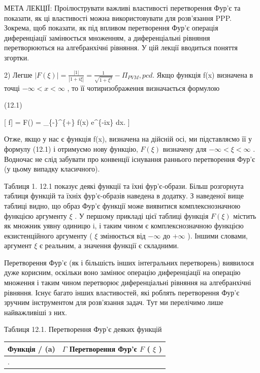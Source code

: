 \documentclass[
  ukrainian,
]{article}
\newcounter{none} %
\begin{document}
МЕТА ЛЕКЦІЇ: Проілюструвати важливі властивості перетворення Фур'є та
показати, як ці властивості можна використовувати для розв'язання PPP.
Зокрема, щоб показати, як під впливом перетворення Фур'є операція
диференціації замінюється множенням, а диференціальні рівняння
перетворюються на алгебранхічні рівняння. У цій лекції вводиться поняття
згортки.

2) Легше
\(|F(\xi)| = \frac{|1|}{|1+i\xi|} = \frac{1}{\sqrt{1+\xi^2}} - \Pi_{PVM}, pcd.\)
Якщо функція f(x) визначена в точці \(-\infty < x < \infty\) , то її
чотиризображення визначається формулою

(12.1)

{[} \mathcal{F}{[}f{]} = F(\xi) = 
\int\_\{-\infty\}\^{}\{+\infty\} f(x) e\^{}\{-i\xi x\} dx. {]}

Отже, якщо у нас є функція f(x), визначена на дійсній осі, ми
підставляємо її у формулу (12.1) і отримуємо нову функцію, \(F(\xi)\)
визначену для \(-\infty < \xi < \infty\) . Водночас не слід забувати про
конвенції існування раннього перетворення Фур'є (у цьому випадку
класичного).

Таблиця 1. 12.1 показує деякі функції та їхні фур'є-образи. Більш
розгорнута таблиця функцій та їхніх фур'є-образів наведена в додатку. З
наведеної вище таблиці видно, що образ Фур'є функції може виявитися
комплекснозначною функцією аргументу \(\xi\) . У першому прикладі цієї
таблиці функція \(F(\xi)\) містить як множник уявну одиницю i, і таким
чином є комплекснозначною функцією екзистенційного аргументу ( \(\xi\)
змінюється від \(-\infty\) до \(+\infty\) ). Іншими словами, аргумент
\(\xi\) є реальним, а значення функції є складними.

Перетворення Фур'є (як і більшість інших інтегральних перетворень)
виявилося дуже корисним, оскільки воно замінює операцію диференціації на
операцію множення і таким чином перетворює диференціальні рівняння на
алгебранхічні рівняння. Існує багато інших властивостей, які роблять
перетворення Фур'є зручним інструментом для розв'язання задач. Тут ми
перелічимо лише найважливіші з них.

Таблиця 12.1. Перетворення Фур'є деяких функцій

{\def\LTcaptype{none} %
\begin{longtable}[]{@{}
  >{\raggedright\arraybackslash}p{}
  >{\raggedright\arraybackslash}p{}@{}}
\toprule\noalign{}
\begin{minipage}[b]{\linewidth}\raggedright
Функція / (a)
\end{minipage} & \begin{minipage}[b]{\linewidth}\raggedright
\(\Gamma\) Перетворення Фур'є \(F\) ( \(\xi\) )
\end{minipage} \\
\midrule\noalign{}
\endhead
\bottomrule\noalign{}
\endlastfoot
1. & \\
\end{longtable}
}
\end{document}
